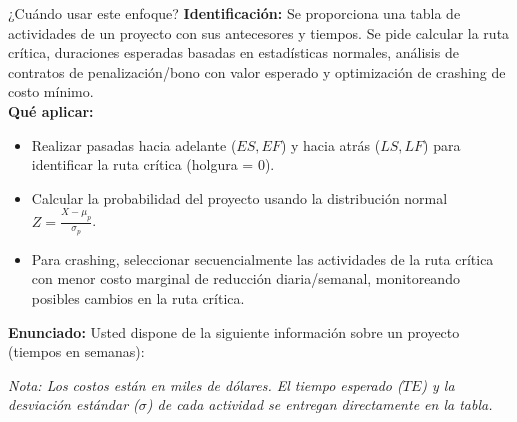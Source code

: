 \documentclass[11pt, a4paper]{article}
\begin{document}
  \begin{tipprueba}{¿Cuándo usar este enfoque?}
    \textbf{Identificación:} Se proporciona una tabla de actividades de un proyecto con sus antecesores y tiempos. Se pide calcular la ruta crítica, duraciones esperadas basadas en estadísticas normales, análisis de contratos de penalización/bono con valor esperado y optimización de crashing de costo mínimo.\\
    \textbf{Qué aplicar:}
    \begin{itemize}
      \item Realizar pasadas hacia adelante ($ES, EF$) y hacia atrás ($LS, LF$) para identificar la ruta crítica (holgura = 0).
      \item Calcular la probabilidad del proyecto usando la distribución normal $Z = \frac{X - \mu_p}{\sigma_p}$.
      \item Para crashing, seleccionar secuencialmente las actividades de la ruta crítica con menor costo marginal de reducción diaria/semanal, monitoreando posibles cambios en la ruta crítica.
    \end{itemize}
  \end{tipprueba}

  \textbf{Enunciado:}
  Usted dispone de la siguiente información sobre un proyecto (tiempos en semanas):

  \begin{center}
  \small
  \end{center}

  \textit{Nota: Los costos están en miles de dólares. El tiempo esperado ($TE$) y la desviación estándar ($\sigma$) de cada actividad se entregan directamente en la tabla.}
\end{document}
